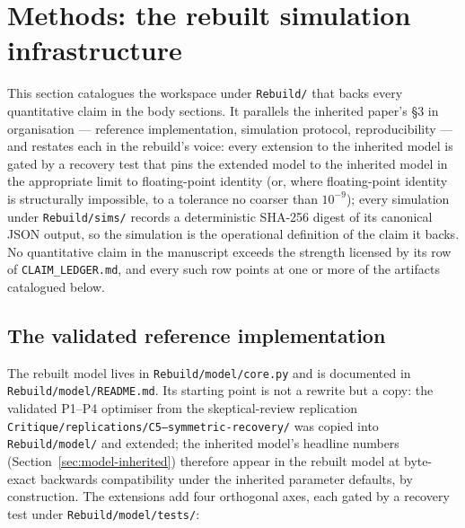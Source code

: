 %
%

\section{Methods: the rebuilt simulation infrastructure}
\label{sec:methods}

This section catalogues the workspace under \texttt{Rebuild/} that
backs every quantitative claim in the body sections.  It parallels
the inherited paper's \S3 in organisation --- reference implementation,
simulation protocol, reproducibility --- and restates each in the
rebuild's voice: every extension to the inherited model is gated by a
recovery test that pins the extended model to the inherited model in
the appropriate limit to floating-point identity (or, where
floating-point identity is structurally impossible, to a tolerance no
coarser than $10^{-9}$); every simulation under \texttt{Rebuild/sims/}
records a deterministic SHA-256 digest of its canonical JSON output,
so the simulation is the operational definition of the claim it
backs.  No quantitative claim in the manuscript exceeds the strength
licensed by its row of \texttt{CLAIM\_LEDGER.md}, and every such row
points at one or more of the artifacts catalogued below.

\subsection{The validated reference implementation}
\label{sec:methods-model}

The rebuilt model lives in \texttt{Rebuild/model/core.py} and is
documented in \texttt{Rebuild/model/README.md}.  Its starting point is
not a rewrite but a copy: the validated P1--P4 optimiser from the
skeptical-review replication \texttt{Critique/replications/\linebreak C5--symmetric-recovery/}
was copied into \texttt{Rebuild/model/} and extended; the inherited
model's headline numbers (Section~\ref{sec:model-inherited}) therefore
appear in the rebuilt model at byte-exact backwards compatibility
under the inherited parameter defaults, by construction.  The
extensions add four orthogonal axes, each gated by a recovery test
under \texttt{Rebuild/model/tests/}:

